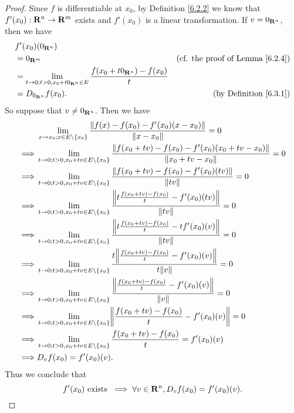 \begin{proof}
    Since \(f\) is differentiable at \(x_0\), by Definition \ref{6.2.2} we know that \(f'(x_0) : \mathbf{R}^n \to \mathbf{R}^m\) exists and \(f'(x_0)\) is a linear transformation.
    If \(v = 0_{\mathbf{R}^n}\), then we have
    \begin{align*}
         & f'(x_0)(0_{\mathbf{R}^n})                                                                                                                     \\
         & = 0_{\mathbf{R}^m}                                                                              & \text{(cf. the proof of Lemma \ref{6.2.4})} \\
         & = \lim_{t \to 0 ; t > 0, x_0 + t 0_{\mathbf{R}^n} \in E} \frac{f(x_0 + t 0_{\mathbf{R}^n}) - f(x_0)}{t}                                               \\
         & = D_{0_{\mathbf{R}^n}} f(x_0).                                                                  & \text{(by Definition \ref{6.3.1})}
    \end{align*}
    So suppose that \(v \neq 0_{\mathbf{R}^n}\).
    Then we have
    \begin{align*}
                 & \lim_{x \to x_0 ; x \in E \setminus \{x_0\}} \frac{\norm*{f(x) - f(x_0) - f'(x_0)(x - x_0)}}{\norm*{x - x_0}} = 0                                  \\
        \implies & \lim_{t \to 0 ; t > 0, x_0 + tv \in E \setminus \{x_0\}} \frac{\norm*{f(x_0 + tv) - f(x_0) - f'(x_0)(x_0 + tv - x_0)}}{\norm*{x_0 + tv - x_0}} = 0 \\
        \implies & \lim_{t \to 0 ; t > 0, x_0 + tv \in E \setminus \{x_0\}} \frac{\norm*{f(x_0 + tv) - f(x_0) - f'(x_0)(tv)}}{\norm*{tv}} = 0                         \\
        \implies & \lim_{t \to 0 ; t > 0, x_0 + tv \in E \setminus \{x_0\}} \frac{\norm*{t \frac{f(x_0 + tv) - f(x_0)}{t} - f'(x_0)(tv)}}{\norm*{tv}} = 0             \\
        \implies & \lim_{t \to 0 ; t > 0, x_0 + tv \in E \setminus \{x_0\}} \frac{\norm*{t \frac{f(x_0 + tv) - f(x_0)}{t} - t f'(x_0)(v)}}{\norm*{tv}} = 0            \\
        \implies & \lim_{t \to 0 ; t > 0, x_0 + tv \in E \setminus \{x_0\}} \frac{t \norm*{\frac{f(x_0 + tv) - f(x_0)}{t} - f'(x_0)(v)}}{t \norm*{v}} = 0             \\
        \implies & \lim_{t \to 0 ; t > 0, x_0 + tv \in E \setminus \{x_0\}} \frac{\norm*{\frac{f(x_0 + tv) - f(x_0)}{t} - f'(x_0)(v)}}{\norm*{v}} = 0                 \\
        \implies & \lim_{t \to 0 ; t > 0, x_0 + tv \in E \setminus \{x_0\}} \norm*{\frac{f(x_0 + tv) - f(x_0)}{t} - f'(x_0)(v)} = 0                                   \\
        \implies & \lim_{t \to 0 ; t > 0, x_0 + tv \in E \setminus \{x_0\}} \frac{f(x_0 + tv) - f(x_0)}{t} = f'(x_0)(v)                                               \\
        \implies & D_v f(x_0) = f'(x_0)(v).
    \end{align*}
    Thus we conclude that
    \[
        f'(x_0) \text{ exists } \implies \forall v \in \mathbf{R}^n, D_v f(x_0) = f'(x_0)(v).
    \]
\end{proof}

